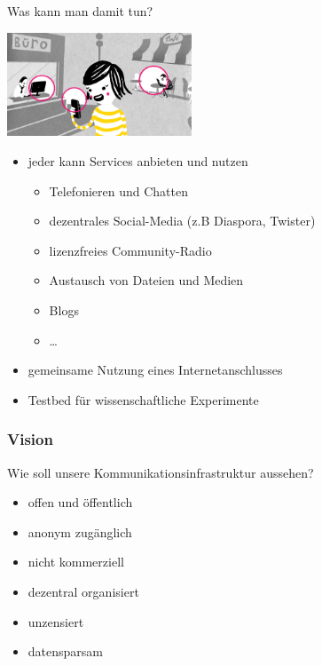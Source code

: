 \documentclass[10pt]{beamer}
\begin{document}
\begin{frame}{Was kann man damit tun?}
	\vfill
	\begin{center}
		\includegraphics[width=5.5cm]{images/verbindet}
	\end{center}
	
	\begin{itemize}[<+->]
		\item jeder kann Services anbieten und nutzen
		\begin{itemize}
			\item Telefonieren und Chatten
			\item dezentrales Social-Media (z.B Diaspora, Twister)
			\item lizenzfreies Community-Radio
			\item Austausch von Dateien und Medien
			\item Blogs
			\item \ldots
		\end{itemize}
		\item gemeinsame Nutzung eines Internetanschlusses
		\item Testbed für wissenschaftliche Experimente
	\end{itemize}
	\vfill
\end{frame}

\begin{frame}
	\frametitle{Vision}
	
	Wie soll unsere Kommunikationsinfrastruktur aussehen?
	
	\begin{itemize}[<+->]
		\item offen und öffentlich
		\item anonym zugänglich
		\item nicht kommerziell
		\item dezentral organisiert
		\item unzensiert
		\item datensparsam
	\end{itemize}
\end{frame}
\end{document}
